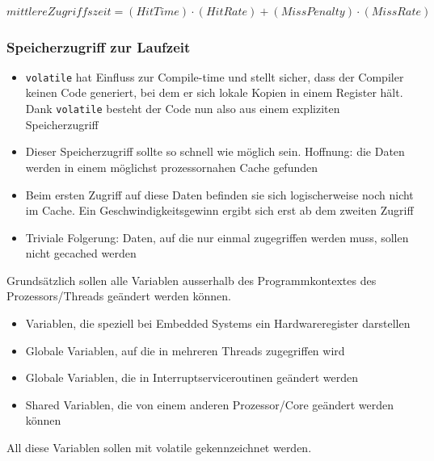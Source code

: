 \textbf{$mittlere Zugriffszeit = (Hit Time) \cdot (Hit Rate) + (Miss Penalty) \cdot (Miss Rate)$}

\subsubsection{Speicherzugriff zur Laufzeit}
\begin{itemize}
	\item \lstinline{volatile} hat Einfluss zur Compile-time und stellt sicher, dass der Compiler keinen Code generiert, bei dem er sich lokale Kopien in einem Register hält. Dank \lstinline{volatile} besteht der Code nun also aus einem expliziten Speicherzugriff
	\item Dieser Speicherzugriff sollte so schnell wie möglich sein. Hoffnung: die Daten werden in einem möglichst prozessornahen Cache gefunden
	\item Beim ersten Zugriff auf diese Daten befinden sie sich logischerweise noch nicht im Cache. Ein Geschwindigkeitsgewinn ergibt sich erst ab dem zweiten Zugriff
	\item Triviale Folgerung: Daten, auf die nur einmal zugegriffen werden muss, sollen nicht gecached werden
\end{itemize}

Grunds\"atzlich sollen alle Variablen ausserhalb des Programmkontextes des Prozessors/Threads ge\"andert werden k\"onnen.
\begin{itemize}
	\item Variablen, die speziell bei Embedded Systems ein Hardwareregister darstellen
	\item Globale Variablen, auf die in mehreren Threads zugegriffen wird
	\item Globale Variablen, die in Interruptserviceroutinen ge\"andert werden
	\item Shared Variablen, die von einem anderen Prozessor/Core ge\"andert werden k\"onnen
\end{itemize}
All diese Variablen sollen mit volatile gekennzeichnet werden.

